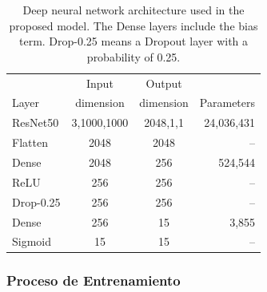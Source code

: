 {\begin{table}[!ht]
    \centering
    \begin{tabular}{| l|c | c | r |}
    \hline
                 &     Input   &  Output    &  \\
    Layer        &   dimension & dimension  & Parameters \\
    \hline\hline
    ResNet50     &     3,1000,1000 &     2048,1,1 & 24,036,431 \\
    Flatten      &     2048        &     2048     &  --        \\
    Dense        &     2048        &     256      & 524,544    \\
    ReLU         &     256         &     256      & --         \\
    Drop-0.25  &     256         &     256      & --         \\
    Dense        &     256         &     15       &  3,855     \\
    Sigmoid      &     15          &     15       & --         \\
    \hline
    \end{tabular}
    \caption{Deep neural network architecture used in the proposed model. The Dense layers include the bias term. Drop-0.25 means a Dropout layer with a probability of 0.25.}
    \label{table_resnet50}
\end{table}

\subsubsection{Proceso de Entrenamiento}
\label{ss:archiecture}

}
